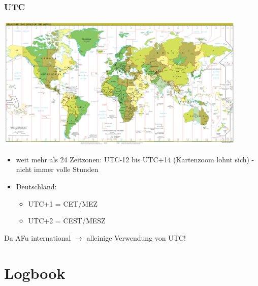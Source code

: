 \begin{frame}
    \frametitle{UTC}

    \begin{center}
        \includegraphics[width=0.9\textwidth]{bv13/Standard_time_zones_of_the_world.png}
        \tiny \hyperlink{refs}{\cite{wc}}
    \end{center}

    \begin{itemize}
        \item weit mehr als 24 Zeitzonen: UTC-12 bis UTC+14 (Kartenzoom lohnt sich)
              - nicht immer volle Stunden
        \item Deutschland:
        \begin{itemize}
            \item UTC+1 = CET/MEZ
            \item UTC+2 = CEST/MESZ
        \end{itemize}
    \end{itemize}

    Da AFu international $\rightarrow$ alleinige Verwendung von UTC!

\end{frame}

\section{Logbook}

